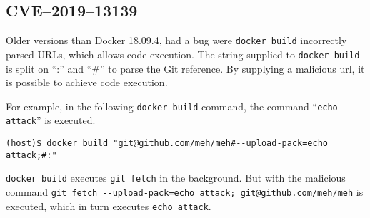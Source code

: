 \subsection{CVE--2019--13139}
Older versions than Docker 18.09.4, had a bug were \lstinline{docker build} incorrectly parsed URLs, which allows code execution\cite{CVE-2019-13139-STAALDRAAD}. The string supplied to \lstinline{docker build} is split on ``:'' and ``\#'' to parse the Git reference. By supplying a malicious url, it is possible to achieve code execution.

\medskip

For example, in the following \lstinline{docker build} command, the command ``\lstinline{echo attack}'' is executed.

\begin{lstlisting}[caption={\lstinline{docker build} command execution.},captionpos=b]
(host)$ docker build "git@github.com/meh/meh#--upload-pack=echo attack;#:"
\end{lstlisting}

\lstinline{docker build} executes \lstinline{git fetch} in the background. But with the malicious command \lstinline{git fetch --upload-pack=echo attack; git@github.com/meh/meh} is executed, which in turn executes \lstinline{echo attack}.
